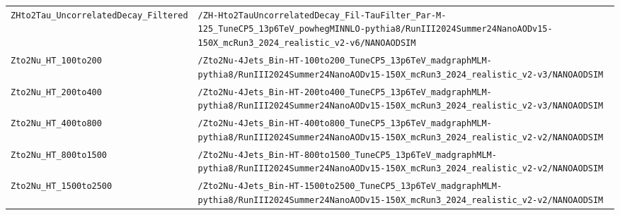 \begin{longtable}{@{}>{\RaggedRight\arraybackslash}p{} >{\RaggedRight\arraybackslash}p{}@{}}
\addlinespace[2pt]
\texttt{ZHto2Tau\_\allowbreak{}UncorrelatedDecay\_\allowbreak{}Filtered} & \texttt{/\allowbreak{}ZH-\allowbreak{}Hto2TauUncorrelatedDecay\_\allowbreak{}Fil-\allowbreak{}TauFilter\_\allowbreak{}Par-\allowbreak{}M-\allowbreak{}125\_\allowbreak{}TuneCP5\_\allowbreak{}13p6TeV\_\allowbreak{}powhegMINNLO-\allowbreak{}pythia8/\allowbreak{}RunIII2024Summer24NanoAODv15-\allowbreak{}150X\_\allowbreak{}mcRun3\_\allowbreak{}2024\_\allowbreak{}realistic\_\allowbreak{}v2-\allowbreak{}v6/\allowbreak{}NANOAODSIM} \\
\addlinespace[2pt]
\texttt{Zto2Nu\_\allowbreak{}HT\_\allowbreak{}100to200} & \texttt{/\allowbreak{}Zto2Nu-\allowbreak{}4Jets\_\allowbreak{}Bin-\allowbreak{}HT-\allowbreak{}100to200\_\allowbreak{}TuneCP5\_\allowbreak{}13p6TeV\_\allowbreak{}madgraphMLM-\allowbreak{}pythia8/\allowbreak{}RunIII2024Summer24NanoAODv15-\allowbreak{}150X\_\allowbreak{}mcRun3\_\allowbreak{}2024\_\allowbreak{}realistic\_\allowbreak{}v2-\allowbreak{}v3/\allowbreak{}NANOAODSIM} \\
\addlinespace[2pt]
\texttt{Zto2Nu\_\allowbreak{}HT\_\allowbreak{}200to400} & \texttt{/\allowbreak{}Zto2Nu-\allowbreak{}4Jets\_\allowbreak{}Bin-\allowbreak{}HT-\allowbreak{}200to400\_\allowbreak{}TuneCP5\_\allowbreak{}13p6TeV\_\allowbreak{}madgraphMLM-\allowbreak{}pythia8/\allowbreak{}RunIII2024Summer24NanoAODv15-\allowbreak{}150X\_\allowbreak{}mcRun3\_\allowbreak{}2024\_\allowbreak{}realistic\_\allowbreak{}v2-\allowbreak{}v3/\allowbreak{}NANOAODSIM} \\
\addlinespace[2pt]
\texttt{Zto2Nu\_\allowbreak{}HT\_\allowbreak{}400to800} & \texttt{/\allowbreak{}Zto2Nu-\allowbreak{}4Jets\_\allowbreak{}Bin-\allowbreak{}HT-\allowbreak{}400to800\_\allowbreak{}TuneCP5\_\allowbreak{}13p6TeV\_\allowbreak{}madgraphMLM-\allowbreak{}pythia8/\allowbreak{}RunIII2024Summer24NanoAODv15-\allowbreak{}150X\_\allowbreak{}mcRun3\_\allowbreak{}2024\_\allowbreak{}realistic\_\allowbreak{}v2-\allowbreak{}v2/\allowbreak{}NANOAODSIM} \\
\addlinespace[2pt]
\texttt{Zto2Nu\_\allowbreak{}HT\_\allowbreak{}800to1500} & \texttt{/\allowbreak{}Zto2Nu-\allowbreak{}4Jets\_\allowbreak{}Bin-\allowbreak{}HT-\allowbreak{}800to1500\_\allowbreak{}TuneCP5\_\allowbreak{}13p6TeV\_\allowbreak{}madgraphMLM-\allowbreak{}pythia8/\allowbreak{}RunIII2024Summer24NanoAODv15-\allowbreak{}150X\_\allowbreak{}mcRun3\_\allowbreak{}2024\_\allowbreak{}realistic\_\allowbreak{}v2-\allowbreak{}v2/\allowbreak{}NANOAODSIM} \\
\addlinespace[2pt]
\texttt{Zto2Nu\_\allowbreak{}HT\_\allowbreak{}1500to2500} & \texttt{/\allowbreak{}Zto2Nu-\allowbreak{}4Jets\_\allowbreak{}Bin-\allowbreak{}HT-\allowbreak{}1500to2500\_\allowbreak{}TuneCP5\_\allowbreak{}13p6TeV\_\allowbreak{}madgraphMLM-\allowbreak{}pythia8/\allowbreak{}RunIII2024Summer24NanoAODv15-\allowbreak{}150X\_\allowbreak{}mcRun3\_\allowbreak{}2024\_\allowbreak{}realistic\_\allowbreak{}v2-\allowbreak{}v2/\allowbreak{}NANOAODSIM} \\

\end{longtable}

